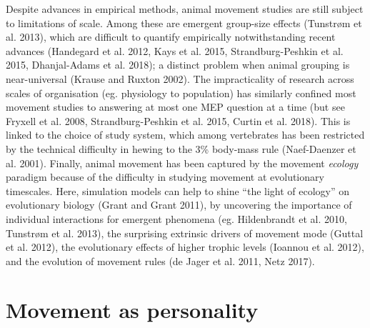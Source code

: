 \documentclass[]{scrartcl}
\begin{document}
\begin{linenumbers}
Despite advances in empirical methods, animal movement studies are still
subject to limitations of scale. Among these are emergent group-size
effects (Tunstrøm et al. 2013), which are difficult to quantify empirically
notwithstanding recent advances (Handegard et al. 2012, Kays et al.
2015, Strandburg-Peshkin et al. 2015, Dhanjal-Adams et al. 2018); a
distinct problem when animal grouping is near-universal (Krause and
Ruxton 2002). The impracticality of research across scales of
organisation (eg. physiology to population) has similarly confined most
movement studies to answering at most one MEP question at a time (but
see Fryxell et al. 2008, Strandburg-Peshkin et al. 2015, Curtin et al.
2018). This is linked to the choice of study system, which among
vertebrates has been restricted by the technical difficulty in hewing to
the 3\% body-mass rule (Naef-Daenzer et al. 2001). Finally, animal
movement has been captured by the movement \emph{ecology} paradigm
because of the difficulty in studying movement at evolutionary
timescales. Here, simulation models can help to shine ``the light of
ecology'' on evolutionary biology (Grant and Grant 2011), by uncovering
the importance of individual interactions for emergent phenomena (eg. Hildenbrandt
et al. 2010, Tunstrøm et al. 2013), the surprising extrinsic drivers of
movement mode (Guttal et al. 2012), the evolutionary effects of higher
trophic levels (Ioannou et al. 2012), and the evolution of movement
rules (de Jager et al. 2011, Netz 2017).

\section{Movement as personality}\label{movement-as-personality}


\end{linenumbers}
\end{document}
